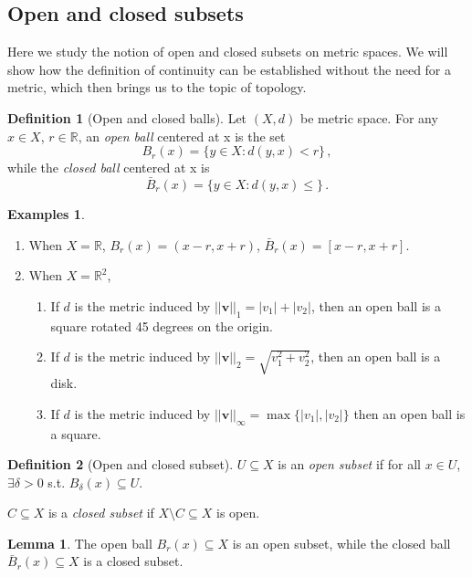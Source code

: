 \documentclass[a4paper,11pt]{article}
\theoremstyle{definition}
\newtheorem*{defn}{Definition}
\newtheorem*{exs}{Examples}
\newtheorem*{lem}{Lemma}
\numberwithin{equation}{section}
\begin{document}
\subsection{Open and closed subsets}
Here we study the notion of open and closed subsets on metric spaces. We will show how the definition of continuity can be established without the need for a metric, which then brings us to the topic of topology.

\begin{defn}[Open and closed balls]
Let $(X,d)$ be metric space. For any $x\in X$, $r\in\mathbb{R}$, an \emph{open ball} centered at x is the set
\begin{equation}
    B_r(x)=\{y\in X: d(y,x)<r\}\,,
\end{equation}
while the \emph{closed ball} centered at x is
\begin{equation}
    \bar{B}_r(x)=\{y\in X: d(y,x)\leq\}\,.
\end{equation}
\end{defn}

\begin{exs}
\leavevmode
\begin{enumerate}
    \item When $X=\mathbb{R}$, $B_r(x)=(x-r,x+r)$, $\bar{B}_r(x)=[x-r,x+r]$.
    \item When $X=\mathbb{R}^2$,
        \begin{enumerate}
        \item If $d$ is the metric induced by $||\mathbf{v}||_1=|v_1|+|v_2|$, then an open ball is a square rotated 45 degrees on the origin.
        \item If $d$ is the metric induced by $||\mathbf{v}||_2=\sqrt{v_1^2+v_2^2}$, then an open ball is a disk.
        \item If $d$ is the metric induced by $||\mathbf{v}||_\infty=\max\{|v_1|,|v_2|\}$ then an open ball is a square.
    \end{enumerate}
\end{enumerate}
\end{exs}

\begin{defn}[Open and closed subset]
$U\subseteq X$ is an \emph{open subset} if for all $x\in U$, $\exists\delta>0$ s.t. $B_\delta(x)\subseteq U$.

$C\subseteq X$ is a \emph{closed subset} if $X\setminus C\subseteq X$ is open.
\end{defn}

\begin{lem}
The open ball $B_r(x)\subseteq X$ is an open subset, while the closed ball $\bar{B}_r(x)\subseteq X$ is a closed subset.
\end{lem}
\end{document}
